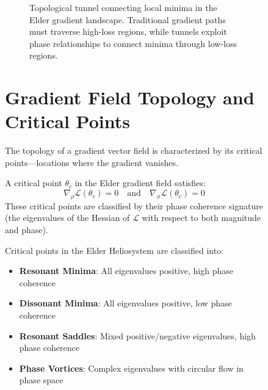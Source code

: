 \begin{figure}[ht]
\begin{figure}[ht]
\caption{Topological tunnel connecting local minima in the Elder gradient landscape. Traditional gradient paths must traverse high-loss regions, while tunnels exploit phase relationships to connect minima through low-loss regions.}
\label{fig:tunnels}
\end{figure}

\section{Gradient Field Topology and Critical Points}

The topology of a gradient vector field is characterized by its critical points—locations where the gradient vanishes.

\begin{definition}
A critical point $\theta_c$ in the Elder gradient field satisfies:
\begin{equation}
\nabla_{\rho}\mathcal{L}(\theta_c) = 0 \quad \text{and} \quad \nabla_{\phi}\mathcal{L}(\theta_c) = 0
\end{equation}
These critical points are classified by their phase coherence signature (the eigenvalues of the Hessian of $\mathcal{L}$ with respect to both magnitude and phase).
\end{definition}

\begin{theorem}
Critical points in the Elder Heliosystem are classified into:
\begin{itemize}
    \item \textbf{Resonant Minima}: All eigenvalues positive, high phase coherence
    \item \textbf{Dissonant Minima}: All eigenvalues positive, low phase coherence
    \item \textbf{Resonant Saddles}: Mixed positive/negative eigenvalues, high phase coherence
    \item \textbf{Phase Vortices}: Complex eigenvalues with circular flow in phase space
\end{itemize}
\end{theorem}

\begin{figure}[ht]
\centering
{}
\end{figure}
\end{figure}
